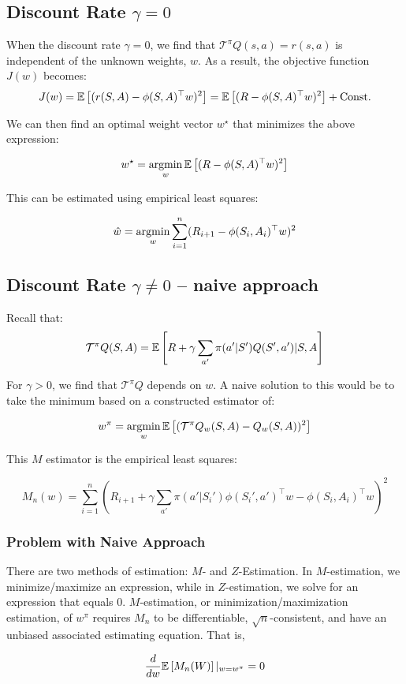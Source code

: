 \documentclass[11pt]{article}
\begin{document}
\subsection{Discount Rate $\gamma = 0$}
When the discount rate $\gamma = 0$, we find that $\mathcal{T}^\pi Q(s, a) = r(s, a)$ is independent of the unknown weights, $w$. As a result, the objective function $J(w)$ becomes:
$$J(w) = \mathbb{E}\left[ (r(S,A) - \phi(S,A)^\top w)^2 \right] = \mathbb{E}\left[ (R - \phi(S,A)^\top w)^2 \right] + \text{Const.}$$

We can then find an optimal weight vector $w^\star$ that minimizes the above expression:

$$w^\star = \operatorname*{argmin}_w \mathbb{E}\left[ (R - \phi(S, A)^\top w)^2 \right]$$

This can be estimated using empirical least squares:

$$\hat{w} = \operatorname*{argmin}_w \sum_{i=1}^n (R_{i+1} - \phi(S_{i}, A_{i})^\top w)^2$$

\subsection{Discount Rate $\gamma \neq 0$ -- naive approach}

Recall that:
$$\mathcal{T}^\pi Q(S, A) = \mathbb{E}\left[ R + \gamma \sum_{a'} \pi(a'|S')Q(S', a') | S, A \right]$$

For $\gamma > 0$, we find that $\mathcal{T}^\pi Q$ depends on $w$. A naive solution to this would be to take the minimum based on a constructed estimator of:

$$w^\pi = \operatorname*{argmin}_w \mathbb{E}\left[ (\mathcal{T}^\pi Q_w(S,A) - Q_w(S,A))^2 \right]$$

This $M$ estimator is the empirical least squares:

$$M_n(w) = \sum_{i=1}^n (R_{i+1} + \gamma \sum_{a'} \pi(a' | S_i') \phi(S_i', a')^\top w - \phi(S_i, A_i)^\top w)^2$$

\subsubsection{Problem with Naive Approach}

There are two methods of estimation: $M$- and $Z$-Estimation. In $M$-estimation, we minimize/maximize an expression, while in $Z$-estimation, we solve for an expression that equals 0. $M$-estimation, or minimization/maximization estimation, of $w^\pi$ requires $M_n$ to be differentiable, $\sqrt{n}$-consistent, and have an unbiased associated estimating equation. That is,

$$\frac{d}{dw}\mathbb{E}\left[ M_n(W) \right]|_{w=w^\pi} = 0$$
\end{document}
